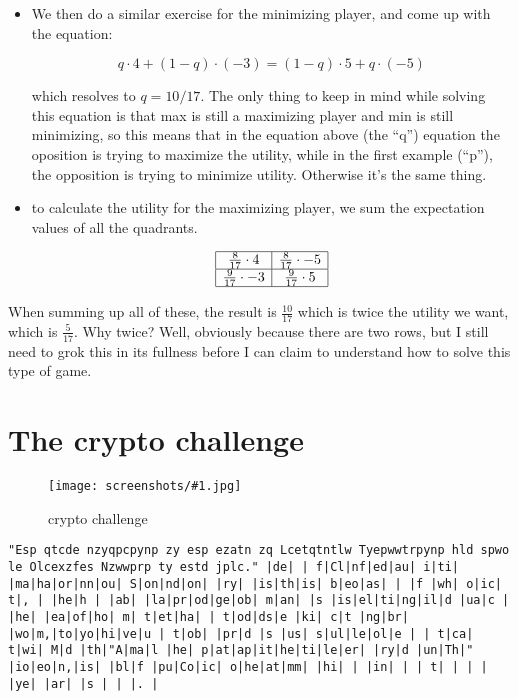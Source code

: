 \documentclass[a4, 12pt, english, USenglish]{scrreprt}
\newcommand{\screenshot}[2]{
\begin{figure}[htb]
\texttt{[image: screenshots/\#1.jpg]}
\label{#1}
\caption{#2}
\end{figure}}
\begin{document}
\begin{itemize}
\begin{itemize}
\end{itemize}

\item We then do a similar exercise for the minimizing player, and
  come up with the equation:

\[
q\cdot 4 + (1-q)\cdot (-3) = (1-q)\cdot 5 + q\cdot (-5)
\]

which resolves to \(q= 10/17\).  The only thing to keep in mind while
solving this equation is that max is still a maximizing player and min
is still minimizing, so this means that in the equation above (the
``q'') equation the oposition is trying to maximize the utility, while
in the first example (``p''), the opposition is trying to minimize
utility. Otherwise it's the same thing.

\item to calculate the utility for the maximizing player, we sum the
  expectation values of all the quadrants.

\[
\begin{array}{|c|c|} \hline
\frac{8}{17} \cdot 4    & \frac{8}{17} \cdot -5\\ \hline
\frac{9}{17} \cdot  -3 & \frac{9}{17}\cdot 5 \\
\hline
\end{array}
\]

\end{itemize}


When summing up all of these, the result is \(\frac{10}{17}\) which is
twice the utility we want, which is \(\frac{5}{17}\).  Why twice?
Well, obviously because there are two rows, but I still need to grok
this in its fullness before I can claim to understand how to solve
this type of game.

\section{The crypto challenge}

\screenshot{cryptochallenge}{crypto challenge}

\begin{verbatim}
"Esp qtcde nzyqpcpynp zy esp ezatn zq Lcetqtntlw Tyepwwtrpynp hld spwo le Olcexzfes Nzwwprp ty estd jplc." |de| | f|Cl|nf|ed|au| i|ti| |ma|ha|or|nn|ou| S|on|nd|on| |ry| |is|th|is| b|eo|as| | |f |wh| o|ic| t|, | |he|h | |ab| |la|pr|od|ge|ob| m|an| |s |is|el|ti|ng|il|d |ua|c | |he| |ea|of|ho| m| t|et|ha| | t|od|ds|e |ki| c|t |ng|br| |wo|m,|to|yo|hi|ve|u | t|ob| |pr|d |s |us| s|ul|le|ol|e | | t|ca| t|wi| M|d |th|"A|ma|l |he| p|at|ap|it|he|ti|le|er| |ry|d |un|Th|" |io|eo|n,|is| |bl|f |pu|Co|ic| o|he|at|mm| |hi| | |in| | | t| | | | |ye| |ar| |s | | |. |
\end{verbatim}





\printindex
\end{document}
